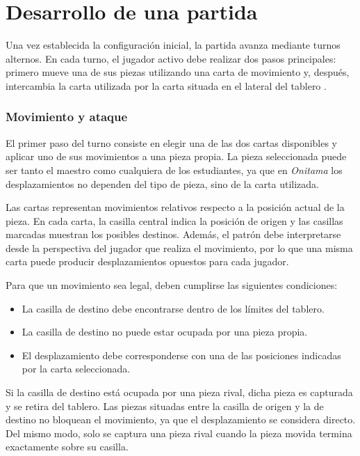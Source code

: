 \section{Desarrollo de una partida}
\label{sec:desarrollo-partida-onitama}

Una vez establecida la configuración inicial, la partida avanza mediante turnos alternos. En cada turno, el jugador activo debe realizar dos pasos principales: primero mueve una de sus piezas utilizando una carta de movimiento y, después, intercambia la carta utilizada por la carta situada en el lateral del tablero \cite{onitama_rulebook}.

\subsubsection*{Movimiento y ataque}

El primer paso del turno consiste en elegir una de las dos cartas disponibles y aplicar uno de sus movimientos a una pieza propia. La pieza seleccionada puede ser tanto el maestro como cualquiera de los estudiantes, ya que en \textit{Onitama} los desplazamientos no dependen del tipo de pieza, sino de la carta utilizada.

Las cartas representan movimientos relativos respecto a la posición actual de la pieza. En cada carta, la casilla central indica la posición de origen y las casillas marcadas muestran los posibles destinos. Además, el patrón debe interpretarse desde la perspectiva del jugador que realiza el movimiento, por lo que una misma carta puede producir desplazamientos opuestos para cada jugador.

Para que un movimiento sea legal, deben cumplirse las siguientes condiciones:

\begin{itemize}
    \item La casilla de destino debe encontrarse dentro de los límites del tablero.
    \item La casilla de destino no puede estar ocupada por una pieza propia.
    \item El desplazamiento debe corresponderse con una de las posiciones indicadas por la carta seleccionada.
\end{itemize}

Si la casilla de destino está ocupada por una pieza rival, dicha pieza es capturada y se retira del tablero. Las piezas situadas entre la casilla de origen y la de destino no bloquean el movimiento, ya que el desplazamiento se considera directo. Del mismo modo, solo se captura una pieza rival cuando la pieza movida termina exactamente sobre su casilla.

